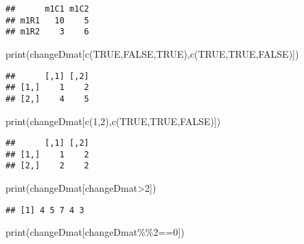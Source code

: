 \documentclass[
]{article}
\newenvironment{Shaded}{\begin{snugshade}}{\end{snugshade}}
\newcommand{\ConstantTok}[1]{\textcolor[rgb]{0.00,0.00,0.00}{#1}}
\newcommand{\DecValTok}[1]{\textcolor[rgb]{0.00,0.00,0.81}{#1}}
\newcommand{\FunctionTok}[1]{\textcolor[rgb]{0.00,0.00,0.00}{#1}}
\newcommand{\NormalTok}[1]{#1}
\newcommand{\SpecialCharTok}[1]{\textcolor[rgb]{0.00,0.00,0.00}{#1}}
\begin{document}
\begin{verbatim}
##      m1C1 m1C2
## m1R1   10    5
## m1R2    3    6
\end{verbatim}

\begin{Shaded}
\begin{Highlighting}[]
\FunctionTok{print}\NormalTok{(changeDmat[}\FunctionTok{c}\NormalTok{(}\ConstantTok{TRUE}\NormalTok{,}\ConstantTok{FALSE}\NormalTok{,}\ConstantTok{TRUE}\NormalTok{),}\FunctionTok{c}\NormalTok{(}\ConstantTok{TRUE}\NormalTok{,}\ConstantTok{TRUE}\NormalTok{,}\ConstantTok{FALSE}\NormalTok{)])}
\end{Highlighting}
\end{Shaded}

\begin{verbatim}
##      [,1] [,2]
## [1,]    1    2
## [2,]    4    5
\end{verbatim}

\begin{Shaded}
\begin{Highlighting}[]
\FunctionTok{print}\NormalTok{(changeDmat[}\FunctionTok{c}\NormalTok{(}\DecValTok{1}\NormalTok{,}\DecValTok{2}\NormalTok{),}\FunctionTok{c}\NormalTok{(}\ConstantTok{TRUE}\NormalTok{,}\ConstantTok{TRUE}\NormalTok{,}\ConstantTok{FALSE}\NormalTok{)])}
\end{Highlighting}
\end{Shaded}

\begin{verbatim}
##      [,1] [,2]
## [1,]    1    2
## [2,]    2    2
\end{verbatim}

\begin{Shaded}
\begin{Highlighting}[]
\FunctionTok{print}\NormalTok{(changeDmat[changeDmat}\SpecialCharTok{\textgreater{}}\DecValTok{2}\NormalTok{])}
\end{Highlighting}
\end{Shaded}

\begin{verbatim}
## [1] 4 5 7 4 3
\end{verbatim}

\begin{Shaded}
\begin{Highlighting}[]
\FunctionTok{print}\NormalTok{(changeDmat[changeDmat}\SpecialCharTok{\%\%}\DecValTok{2}\SpecialCharTok{==}\DecValTok{0}\NormalTok{])}
\end{Highlighting}
\end{Shaded}
\end{document}
